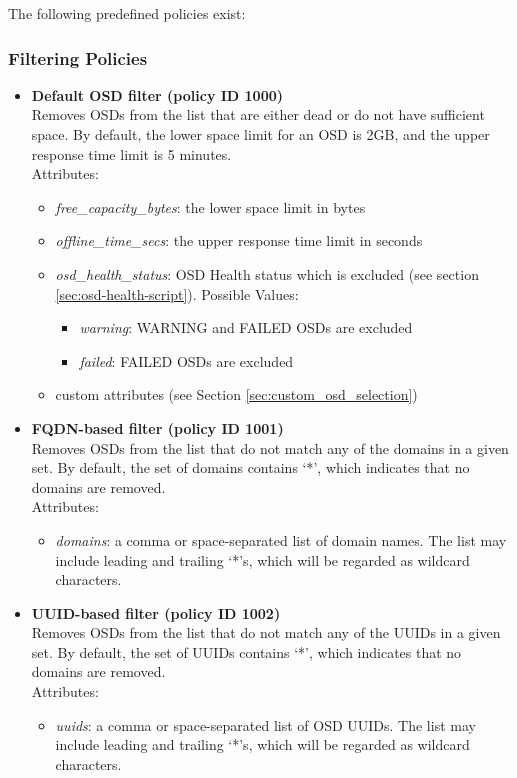 \documentclass[a4paper,10pt]{book}
\begin{document}
The following predefined policies exist:

\subsubsection{Filtering Policies}
\begin{itemize}

 \item \textbf{Default OSD filter (policy ID 1000)}\\
 Removes OSDs from the list that are either dead or do not have sufficient space. By default, the lower space limit for an OSD is 2GB, and the upper response time limit is 5 minutes.\\

 Attributes:
 \begin{itemize}
 \item \emph{free\_capacity\_bytes}: the lower space limit in bytes
 \item \emph{offline\_time\_secs}: the upper response time limit in seconds
 \item \emph{osd\_health\_status}: OSD Health status which is excluded (see section \ref{sec:osd-health-script}). Possible Values:
 \begin{itemize}
 \item \emph{warning}: WARNING and FAILED OSDs are excluded
 \item \emph{failed}: FAILED OSDs are excluded
 \end{itemize}
 \item custom attributes (see Section \ref{sec:custom_osd_selection})
 \end{itemize}

 \item \textbf{FQDN-based filter (policy ID 1001)}\\
 Removes OSDs from the list that do not match any of the domains in a given set. By default, the set of domains contains `*', which indicates that no domains are removed.\\

 Attributes:
 \begin{itemize}
 \item \emph{domains}: a comma or space-separated list of domain names. The list may include leading and trailing `*'s, which will be regarded as wildcard characters.
 \end{itemize}

 \item \textbf{UUID-based filter (policy ID 1002)}\\
 Removes OSDs from the list that do not match any of the UUIDs in a given set. By default, the set of UUIDs contains `*', which indicates that no domains are removed.\\

 Attributes:
 \begin{itemize}
 \item \emph{uuids}: a comma or space-separated list of OSD UUIDs. The list may include leading and trailing `*'s, which will be regarded as wildcard characters.
 \end{itemize}

\end{itemize}
\end{document}
